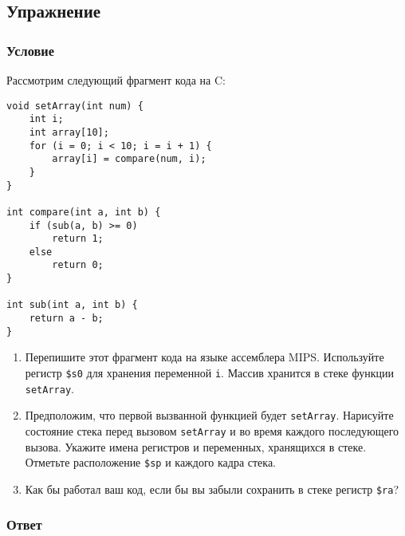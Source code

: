 \documentclass[12pt]{article}
\newenvironment{e}[1][dummy label]{
    \subsection{Упражнение}\label{#1}
    \subsubsection*{Условие}
    }{
    \subsubsection*{Ответ}
}
\begin{document}
    \newpage

    \begin{e}
        Рассмотрим следующий фрагмент кода на C:
        \begin{verbatim}
void setArray(int num) {
    int i;
    int array[10];
    for (i = 0; i < 10; i = i + 1) {
        array[i] = compare(num, i);
    }
}

int compare(int a, int b) {
    if (sub(a, b) >= 0)
        return 1;
    else
        return 0;
}

int sub(int a, int b) {
    return a - b;
}
        \end{verbatim}
        \begin{enumerate}
            \item Перепишите этот фрагмент кода на языке ассемблера MIPS. Используйте регистр \texttt{\$s0} для хранения переменной \texttt{i}. Массив хранится в стеке функции \texttt{setArray}.
            \item Предположим, что первой вызванной функцией будет \texttt{setArray}. Нарисуйте состояние стека перед вызовом \texttt{setArray} и во время каждого последующего вызова. Укажите имена регистров и переменных, хранящихся в стеке. Отметьте расположение \texttt{\$sp} и каждого кадра стека.
            \item Как бы работал ваш код, если бы вы забыли сохранить в стеке регистр \texttt{\$ra}?
        \end{enumerate}
    \end{e}
\end{document}
